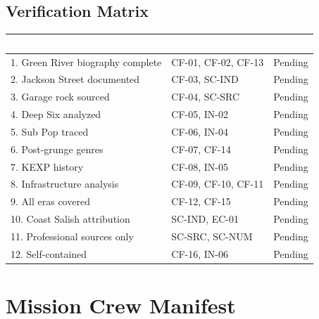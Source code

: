 \documentclass[11pt,letterpaper]{article}
\newcommand{\tableheader}[1]{\textbf{\sffamily\textcolor{white}{#1}}}
\begin{document}
\subsection{Verification Matrix}

\begin{center}
\begin{tabularx}{\textwidth}{XL{3.5cm}C{1.5cm}}
\toprule
{}
\tableheader{Success Criterion} & \tableheader{Test ID(s)} & \tableheader{Status} \\
. Green River biography complete & CF-01, CF-02, CF-13 & Pending \\
2. Jackson Street documented & CF-03, SC-IND & Pending \\
3. Garage rock sourced & CF-04, SC-SRC & Pending \\
4. Deep Six analyzed & CF-05, IN-02 & Pending \\
5. Sub Pop traced & CF-06, IN-04 & Pending \\
6. Post-grunge genres & CF-07, CF-14 & Pending \\
7. KEXP history & CF-08, IN-05 & Pending \\
8. Infrastructure analysis & CF-09, CF-10, CF-11 & Pending \\
9. All eras covered & CF-12, CF-15 & Pending \\
10. Coast Salish attribution & SC-IND, EC-01 & Pending \\
11. Professional sources only & SC-SRC, SC-NUM & Pending \\
12. Self-contained & CF-16, IN-06 & Pending \\
\bottomrule
\end{tabularx}
\end{center}

\section{Mission Crew Manifest}
\end{document}
